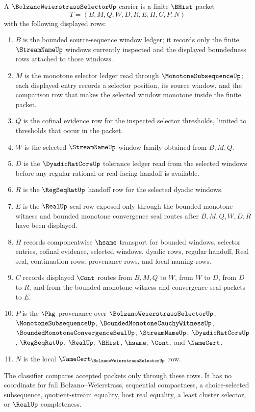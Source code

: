 \begin{definition}
\label{def:bolzano-weierstrass-selector-carrier}
A $\BolzanoWeierstrassSelectorUp$ carrier is a finite $\BHist$ packet
$$
T=(B,M,Q,W,D,R,E,H,C,P,N)
$$
with the following displayed rows:
\begin{enumerate}
\item $B$ is the bounded source-sequence window ledger; it records only the finite $\StreamNameUp$ windows currently inspected and the displayed boundedness rows attached to those windows.
\item $M$ is the monotone selector ledger read through $\MonotoneSubsequenceUp$; each displayed entry records a selector position, its source window, and the comparison row that makes the selected window monotone inside the finite packet.
\item $Q$ is the cofinal evidence row for the inspected selector thresholds, limited to thresholds that occur in the packet.
\item $W$ is the selected $\StreamNameUp$ window family obtained from $B,M,Q$.
\item $D$ is the $\DyadicRatCoreUp$ tolerance ledger read from the selected windows before any regular rational or real-facing handoff is available.
\item $R$ is the $\RegSeqRatUp$ handoff row for the selected dyadic windows.
\item $E$ is the $\RealUp$ seal row exposed only through the bounded monotone witness and bounded monotone convergence seal routes after $B,M,Q,W,D,R$ have been displayed.
\item $H$ records componentwise $\hsame$ transport for bounded windows, selector entries, cofinal evidence, selected windows, dyadic rows, regular handoff, Real seal, continuation rows, provenance rows, and local naming rows.
\item $C$ records displayed $\Cont$ routes from $B,M,Q$ to $W$, from $W$ to $D$, from $D$ to $R$, and from the bounded monotone witness and convergence seal packets to $E$.
\item $P$ is the $\Pkg$ provenance over $\BolzanoWeierstrassSelectorUp$, $\MonotoneSubsequenceUp$, $\BoundedMonotoneCauchyWitnessUp$, $\BoundedMonotoneConvergenceSealUp$, $\StreamNameUp$, $\DyadicRatCoreUp$, $\RegSeqRatUp$, $\RealUp$, $\BHist$, $\hsame$, $\Cont$, and $\NameCert$.
\item $N$ is the local $\NameCert_{\BolzanoWeierstrassSelectorUp}$ row.
\end{enumerate}
The classifier compares accepted packets only through these rows. It has no coordinate for full Bolzano--Weierstrass, sequential compactness, a choice-selected subsequence, quotient-stream equality, host real equality, a least cluster selector, or $\RealUp$ completeness.
\end{definition}

